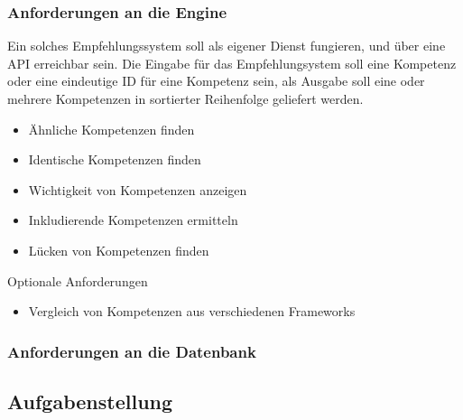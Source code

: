 \subsubsection{Anforderungen an die Engine}
Ein solches Empfehlungssystem soll als eigener Dienst fungieren, und über eine API erreichbar sein. Die Eingabe für das Empfehlungsystem soll eine Kompetenz oder eine eindeutige ID für eine Kompetenz sein, als Ausgabe soll eine oder mehrere Kompetenzen in sortierter Reihenfolge geliefert werden. 
\begin{itemize}
	\item Ähnliche Kompetenzen finden
	\item Identische Kompetenzen finden
	\item Wichtigkeit von Kompetenzen anzeigen
	\item Inkludierende Kompetenzen ermitteln
	\item Lücken von Kompetenzen finden
\end{itemize}

Optionale Anforderungen

\begin{itemize}
	\item Vergleich von Kompetenzen aus verschiedenen Frameworks
\end{itemize}



\subsubsection{Anforderungen an die Datenbank}

\subsection{Aufgabenstellung}

